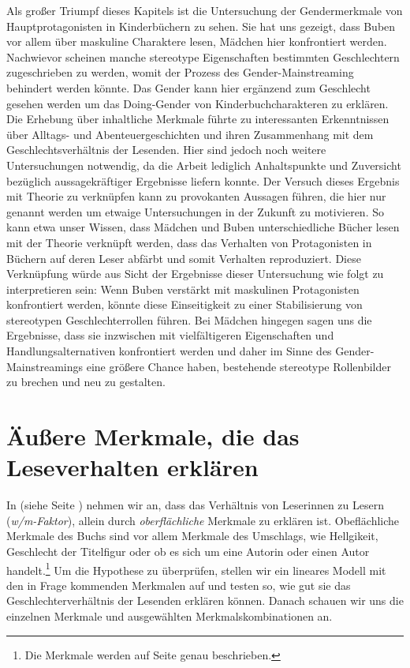 Als großer Triumpf dieses Kapitels ist die Untersuchung der
Gendermerkmale von Hauptprotagonisten in Kinderbüchern zu sehen. Sie hat
uns gezeigt, dass Buben vor allem über maskuline Charaktere lesen,
Mädchen hier konfrontiert werden. Nachwievor scheinen manche stereotype
Eigenschaften bestimmten Geschlechtern zugeschrieben zu werden, womit
der Prozess des Gender-Mainstreaming behindert werden könnte. Das Gender
kann hier ergänzend zum Geschlecht gesehen werden um das Doing-Gender
von Kinderbuchcharakteren zu erklären. Die Erhebung über inhaltliche
Merkmale führte zu interessanten Erkenntnissen über Alltags- und
Abenteuergeschichten und ihren Zusammenhang mit dem
Geschlechtsverhältnis der Lesenden. Hier sind jedoch noch weitere
Untersuchungen notwendig, da die Arbeit lediglich Anhaltspunkte und
Zuversicht bezüglich aussagekräftiger Ergebnisse liefern konnte. Der
Versuch dieses Ergebnis mit Theorie zu verknüpfen kann zu provokanten
Aussagen führen, die hier nur genannt werden um etwaige Untersuchungen
in der Zukunft zu motivieren. So kann etwa unser Wissen, dass Mädchen
und Buben unterschiedliche Bücher lesen mit der Theorie verknüpft
werden, dass das Verhalten von Protagonisten in Büchern auf deren Leser
abfärbt und somit Verhalten reproduziert. Diese Verknüpfung würde aus
Sicht der Ergebnisse dieser Untersuchung wie folgt zu interpretieren
sein: Wenn Buben verstärkt mit maskulinen Protagonisten konfrontiert
werden, könnte diese Einseitigkeit zu einer Stabilisierung von
stereotypen Geschlechterrollen führen. Bei Mädchen hingegen sagen uns
die Ergebnisse, dass sie inzwischen mit vielfältigeren Eigenschaften und
Handlungsalternativen konfrontiert werden und daher im Sinne des
Gender-Mainstreamings eine größere Chance haben, bestehende stereotype
Rollenbilder zu brechen und neu zu gestalten.

\chapter{Äußere Merkmale, die das Leseverhalten erklären}

In  (siehe Seite \pageref{h5}) nehmen wir an, dass das
Verhältnis von Leserinnen zu Lesern (\emph{w/m-Faktor}), allein durch
\emph{oberflächliche} Merkmale zu erklären ist. Obeflächliche Merkmale
des Buchs sind vor allem Merkmale des Umschlags, wie Hellgikeit,
Geschlecht der Titelfigur oder ob es sich um eine Autorin oder einen
Autor
handelt.\footnote{Die Merkmale werden auf Seite \pageref{meth.merkmale} genau beschrieben.}
Um die Hypothese zu überprüfen, stellen wir ein lineares Modell mit den
in Frage kommenden Merkmalen auf und testen so, wie gut sie das
Geschlechterverhältnis der Lesenden erklären können. Danach schauen wir
uns die einzelnen Merkmale und ausgewählten Merkmalskombinationen an.


